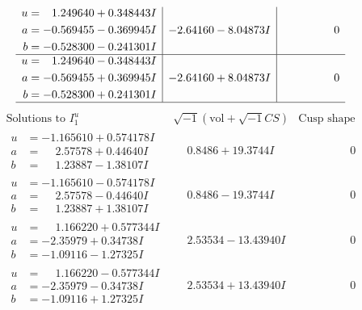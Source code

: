 \documentclass[1p]{elsarticle_modified}
\theoremstyle{definition}
\newcommand{\I}{\sqrt{-1}}
\begin{document}
$$\begin{array}{c|c|c}
\begin{aligned}
u &= \phantom{-}1.249640 + 0.348443 I \\
a &= -0.569455 - 0.369945 I \\
b &= -0.528300 - 0.241301 I\end{aligned}
 & -2.64160 - 8.04873 I & \phantom{-0.000000 } 0 \\ \hline\begin{aligned}
u &= \phantom{-}1.249640 - 0.348443 I \\
a &= -0.569455 + 0.369945 I \\
b &= -0.528300 + 0.241301 I\end{aligned}
 & -2.64160 + 8.04873 I & \phantom{-0.000000 } 0\\
 \hline 
 \end{array}$$\newpage$$\begin{array}{c|c|c}  
\text{Solutions to }I^u_{1}& \I (\text{vol} + \sqrt{-1}CS) & \text{Cusp shape}\\
 \hline 
\begin{aligned}
u &= -1.165610 + 0.574178 I \\
a &= \phantom{-}2.57578 + 0.44640 I \\
b &= \phantom{-}1.23887 - 1.38107 I\end{aligned}
 & \phantom{-}0.8486 + 19.3744 I & \phantom{-0.000000 } 0 \\ \hline\begin{aligned}
u &= -1.165610 - 0.574178 I \\
a &= \phantom{-}2.57578 - 0.44640 I \\
b &= \phantom{-}1.23887 + 1.38107 I\end{aligned}
 & \phantom{-}0.8486 - 19.3744 I & \phantom{-0.000000 } 0 \\ \hline\begin{aligned}
u &= \phantom{-}1.166220 + 0.577344 I \\
a &= -2.35979 + 0.34738 I \\
b &= -1.09116 - 1.27325 I\end{aligned}
 & \phantom{-}2.53534 - 13.43940 I & \phantom{-0.000000 } 0 \\ \hline\begin{aligned}
u &= \phantom{-}1.166220 - 0.577344 I \\
a &= -2.35979 - 0.34738 I \\
b &= -1.09116 + 1.27325 I\end{aligned}
 & \phantom{-}2.53534 + 13.43940 I & \phantom{-0.000000 } 0 \\ \hline\begin{aligned}

\end{aligned}
\end{array}$$
\end{document}
